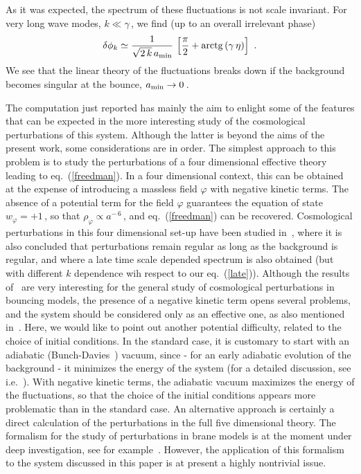 \documentclass[a4paper,11pt]{article}
\begin{document}
As it was expected, the spectrum of these fluctuations is not scale
invariant. For very long wave modes, $k \ll \gamma\,$, we find (up to an
overall irrelevant phase)
%
\begin{equation}
\delta \phi_k \simeq \frac{1}{\sqrt{2 \, k}\,a_{\rm min}} \, \left[ \frac{\pi}{2} +
{\rm arctg } \left( \gamma \, \eta \right) \right] \,\,.
\label{late}
\end{equation}
%
We see that the linear theory of the fluctuations breaks down if the background becomes singular at the bounce, $a_{\rm min} \rightarrow 0\,$.

The computation just reported has mainly the aim to enlight some of the
features that can be expected in the more interesting study of the
cosmological perturbations of this system. Although the latter is beyond
the aims of the present work, some considerations are in order. The
simplest approach to this problem is to study the perturbations of a four
dimensional effective theory leading to eq.~(\ref{freedman}). In a four
dimensional context, this can be obtained at the expense of introducing a
massless field $\varphi$ with negative kinetic terms. The absence of a
potential term for the field $\varphi$ guarantees the equation of state
$w_{\varphi} = + 1\,$, so that $\rho_{\varphi} \propto a^{-\,6}\,$, and
eq.~(\ref{freedman}) can be recovered. Cosmological perturbations in this
four dimensional set-up have been studied in~\cite{PEPI}, where it is also
concluded that perturbations remain regular as long as the background is
regular, and where a late time scale depended spectrum is also obtained
(but with different $k$ dependence wih respect to our eq.~(\ref{late})).
Although the results of~\cite{PEPI} are very interesting for the general
study of cosmological perturbations in bouncing models, the presence of a
negative kinetic term opens several problems, and the system should be
considered only as an effective one, as also mentioned in~\cite{PEPI}.
Here, we would like to point out another potential difficulty, related to
the choice of initial conditions. In the standard case, it is customary to
start with an adiabatic (Bunch-Davies~\cite{BUDE}) vacuum, since - for an 
early adiabatic evolution of the background - it minimizes the energy of
the system (for a detailed discussion, see i.e.~\cite{MABR}). With
negative kinetic terms, the adiabatic vacuum maximizes the energy of the
fluctuations, so that the choice of the initial conditions appears more
problematic than in the standard case. An alternative approach is
certainly a direct calculation of the perturbations in the full five
dimensional theory. The formalism for the study of perturbations in brane
models is at the moment under deep investigation, see for
example~\cite{P1,P2,P3}. However, the application of this formalism to the
system discussed in this paper is at present a highly nontrivial issue.
\end{document}
